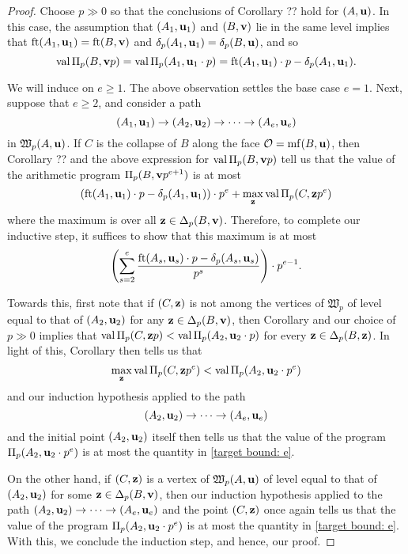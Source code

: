 \documentclass[11pt]{amsart}
\begin{document}
\begin{proof}  

Choose $p \gg 0$ so that the conclusions of Corollary ?? hold for $(A, \mathbf{u})$.  In this case, the assumption that $(A_1, \mathbf{u}_1)$ and $(B, \mathbf{v})$ lie in the same level implies that $\operatorname{ft}(A_1, \mathbf{u}_1) = \operatorname{ft}(B, \mathbf{v})$ and $\delta_p(A_1, \mathbf{u}_1) = \delta_p(B, \mathbf{u})$, and so 
\[ \operatorname{val} \Pi_p(B, \mathbf{v}p) = \operatorname{val} \Pi_p (A_1, \mathbf{u}_1 \cdot p) = \operatorname{ft}(A_1, \mathbf{u}_1) \cdot p - \delta_p(A_1, \mathbf{u}_1). \] 

We will induce on $e \geq 1$.  The above observation settles the base case $e=1$.  Next, suppose that $e \geq 2$, and consider a path  \[ (A_1, \mathbf{u}_1) \to (A_2, \mathbf{u}_2) \to \cdots \to (A_e, \mathbf{u}_e)\] in $\mathfrak{W}_p(A, \mathbf{u})$.  If $C$ is the collapse of $B$ along the face $\mathcal{O} = \operatorname{mf}(B, \mathbf{u})$, then Corollary ??  and the above expression for $\operatorname{val} \Pi_p(B, \mathbf{v}p)$ tell us that the value of the arithmetic program $\Pi_p(B, \mathbf{v}p^{e+1})$ is at most
%
\[  \left( \operatorname{ft}(A_1, \mathbf{u}_1) \cdot p - \delta_p(A_1, \mathbf{u}_1) \right) \cdot p^e +  \max_{\mathbf{z}} \operatorname{val} \Pi_p(C, \mathbf{z}p^e) \]
%
where the maximum is over all $\mathbf{z} \in \Delta_p(B, \mathbf{v})$.   Therefore, to complete our inductive step, it suffices to show that this maximum is at most
%
\begin{equation}
\label{target bound: e}
\left( \sum_{s=2}^e \frac{ \operatorname{ft}(A_s, \mathbf{u}_s)  \cdot p - \delta_p(A_s, \mathbf{u}_s)}{p^s} \right) \cdot p^{e-1}.  \end{equation}

Towards this, first note that if $(C, \mathbf{z})$ is not among the vertices of $\mathfrak{W}_p$ of level equal to that of $(A_2, \mathbf{u}_2)$ for any $\mathbf{z} \in \Delta_p(B, \mathbf{v})$, then Corollary \!{} and our choice of $p \gg 0$ implies that $\operatorname{val} \Pi_p(C, \mathbf{z}p) < \operatorname{val} \Pi_p(A_2, \mathbf{u}_2 \cdot p)$ for every $\mathbf{z} \in \Delta_p(B, \mathbf{z})$.  In light of this, Corollary \!{} then tells us that 
\[  \max_{\mathbf{z}} \operatorname{val} \Pi_p(C, \mathbf{z}p^e) < \operatorname{val} \Pi_p(A_2, \mathbf{u}_2 \cdot p^e)\]  
and our induction hypothesis applied to the path 
\[ (A_2, \mathbf{u}_2) \to \cdots \to (A_e, \mathbf{u}_e) \] and the initial point $(A_2, \mathbf{u}_2)$ itself then tells us that the value of the program $\Pi_p(A_2, \mathbf{u}_2 \cdot p^e)$ is at most the quantity in \eqref{target bound: e}.  

On the other hand, if $(C, \mathbf{z})$ is a vertex of $\mathfrak{W}_p(A, \mathbf{u})$ of level equal to that of $(A_2, \mathbf{u}_2)$ for some $\mathbf{z} \in \Delta_p(B, \mathbf{v})$, then our induction hypothesis applied to the path 
$(A_2, \mathbf{u}_2) \to \cdots \to (A_e, \mathbf{u}_e)$ and the point $(C, \mathbf{z})$ once again tells us that the value of the program $\Pi_p(A_2, \mathbf{u}_2 \cdot p^e)$ is at most the quantity in \eqref{target bound: e}.  With this, we conclude the induction step, and hence, our proof. 
\end{proof}
\end{document}
